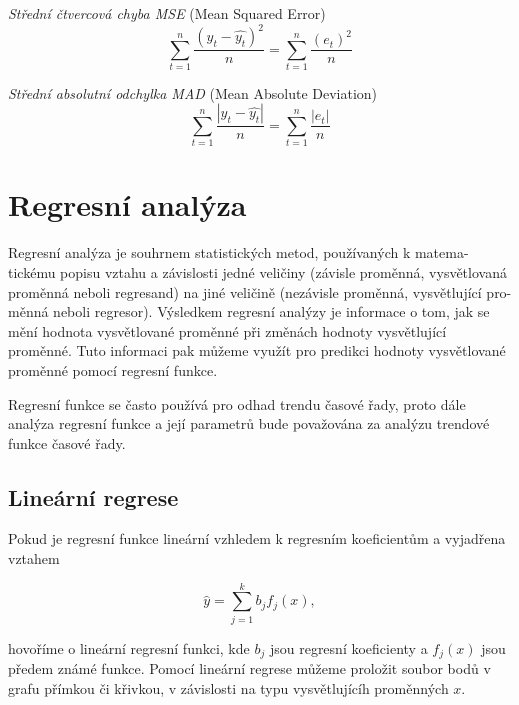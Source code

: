 \documentclass[a4paper,12pt,twoside]{scrreprt}
\begin{document}
\textit{Střední čtvercová chyba MSE} (Mean Squared Error)
\begin{equation}
\sum_{t=1}^{n}\frac{(y_t - \hat{y_t})^2}{n} = \sum_{t=1}^{n}\frac{(e_t)^2}{n}
\end{equation}

\textit{Střední absolutní odchylka MAD} (Mean Absolute Deviation)
\begin{equation}
\sum_{t=1}^{n}\frac{|y_t - \hat{y_t}|}{n} = \sum_{t=1}^{n}\frac{|e_t|}{n}
\end{equation}

\newpage
\section{Regresní analýza}
\vspace{0.5cm}

Regresní analýza je souhrnem statistických metod, používaných k matema-tickému popisu vztahu a závislosti jedné veličiny (závisle proměnná, vysvětlovaná proměnná neboli regresand) na jiné veličině (nezávisle proměnná, vysvětlující pro-měnná neboli regresor). Výsledkem regresní analýzy je informace o tom, jak se mění hodnota vysvětlované proměnné při změnách hodnoty vysvětlující proměnné. Tuto informaci pak můžeme využít pro predikci hodnoty vysvětlované proměnné pomocí regresní funkce. 

Regresní funkce se často používá pro odhad trendu časové řady, proto dále analýza regresní funkce a její parametrů bude považována za analýzu trendové funkce časové řady.

\subsection{Lineární regrese}

Pokud je regresní funkce lineární vzhledem k regresním koeficientům a vyjadřena vztahem 

\begin{equation}
\hat{y} = \sum_{j=1}^{k}b_jf_j(x),
\end{equation}

hovoříme o lineární regresní funkci, kde \textit{$b_j$} jsou regresní koeficienty a \textit{$f_j$}$(x)$ jsou předem známé funkce. Pomocí lineární regrese můžeme proložit soubor bodů v grafu přímkou či křivkou, v závislosti na typu vysvětlujícíh proměnných $x$. 
\end{document}
